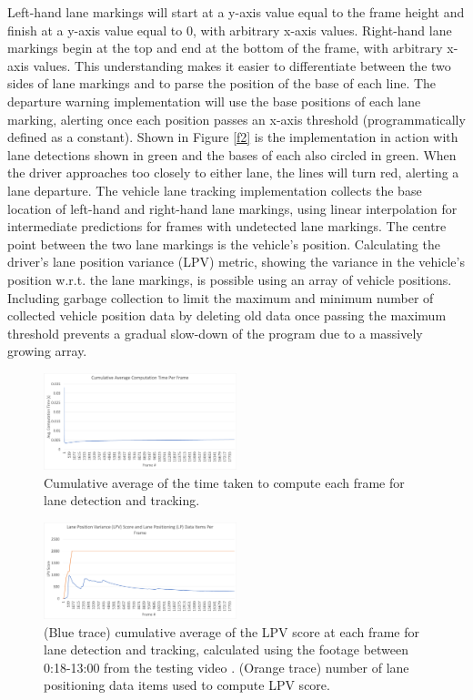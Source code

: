 \documentclass[10pt,conference]{IEEEtran}
\begin{document}
Left-hand lane markings will start at a y-axis value equal to the frame height and finish at a y-axis value equal to 0, with arbitrary x-axis values. Right-hand lane markings begin at the top and end at the bottom of the frame, with arbitrary x-axis values. This understanding makes it easier to differentiate between the two sides of lane markings and to parse the position of the base of each line. The departure warning implementation will use the base positions of each lane marking, alerting once each position passes an x-axis threshold (programmatically defined as a constant). Shown in Figure \ref{f2} is the implementation in action with lane detections shown in green and the bases of each also circled in green. When the driver approaches too closely to either lane, the lines will turn red, alerting a lane departure. The vehicle lane tracking implementation collects the base location of left-hand and right-hand lane markings, using linear interpolation for intermediate predictions for frames with undetected lane markings. The centre point between the two lane markings is the vehicle's position. Calculating the driver's lane position variance (LPV) metric, showing the variance in the vehicle's position w.r.t. the lane markings, is possible using an array of vehicle positions. Including garbage collection to limit the maximum and minimum number of collected vehicle position data by deleting old data once passing the maximum threshold prevents a gradual slow-down of the program due to a massively growing array.

\begin{figure}[htbp]
    \centerline{\includegraphics[width=0.5\textwidth]{assets/LD_Avg-FPT.png}}
    \caption{Cumulative average of the time taken to compute each frame for lane detection and tracking.}
    \label{f3}
\end{figure}

\begin{figure}[htbp]
    \centerline{\includegraphics[width=0.5\textwidth]{assets/LD_Avg-LPV.png}}
    \caption{(Blue trace) cumulative average of the LPV score at each frame for lane detection and tracking, calculated using the footage between 0:18-13:00 from the testing video \cite{b8}. (Orange trace) number of lane positioning data items used to compute LPV score.}
    \label{f4}
\end{figure}
\end{document}
